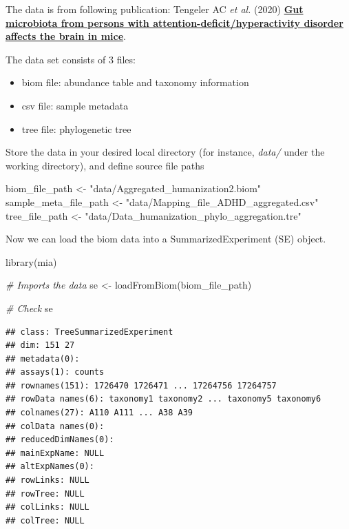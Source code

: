 \documentclass[
]{book}
\newenvironment{Shaded}{\begin{snugshade}}{\end{snugshade}}
\newcommand{\CommentTok}[1]{\textcolor[rgb]{0.56,0.35,0.01}{\textit{#1}}}
\newcommand{\FunctionTok}[1]{\textcolor[rgb]{0.00,0.00,0.00}{#1}}
\newcommand{\NormalTok}[1]{#1}
\newcommand{\OtherTok}[1]{\textcolor[rgb]{0.56,0.35,0.01}{#1}}
\newcommand{\StringTok}[1]{\textcolor[rgb]{0.31,0.60,0.02}{#1}}
\providecommand{\tightlist}{%
  \setlength{\itemsep}{0pt}\setlength{\parskip}{0pt}}
\begin{document}
The data is from following publication:
Tengeler AC \emph{et al.} (2020) \href{https://doi.org/10.1186/s40168-020-00816-x}{\textbf{Gut microbiota from persons with
attention-deficit/hyperactivity disorder affects the brain in
mice}}.

The data set consists of 3 files:

\begin{itemize}
\tightlist
\item
  biom file: abundance table and taxonomy information
\item
  csv file: sample metadata
\item
  tree file: phylogenetic tree
\end{itemize}

Store the data in your desired local directory (for instance, \emph{data/} under the
working directory), and define source file paths

\begin{Shaded}
\begin{Highlighting}[]
\NormalTok{biom\_file\_path }\OtherTok{\textless{}{-}} \StringTok{"data/Aggregated\_humanization2.biom"}
\NormalTok{sample\_meta\_file\_path }\OtherTok{\textless{}{-}} \StringTok{"data/Mapping\_file\_ADHD\_aggregated.csv"}
\NormalTok{tree\_file\_path }\OtherTok{\textless{}{-}} \StringTok{"data/Data\_humanization\_phylo\_aggregation.tre"}
\end{Highlighting}
\end{Shaded}

Now we can load the biom data into a SummarizedExperiment (SE) object.

\begin{Shaded}
\begin{Highlighting}[]
\FunctionTok{library}\NormalTok{(mia)}

\CommentTok{\# Imports the data}
\NormalTok{se }\OtherTok{\textless{}{-}} \FunctionTok{loadFromBiom}\NormalTok{(biom\_file\_path)}

\CommentTok{\# Check}
\NormalTok{se}
\end{Highlighting}
\end{Shaded}

\begin{verbatim}
## class: TreeSummarizedExperiment 
## dim: 151 27 
## metadata(0):
## assays(1): counts
## rownames(151): 1726470 1726471 ... 17264756 17264757
## rowData names(6): taxonomy1 taxonomy2 ... taxonomy5 taxonomy6
## colnames(27): A110 A111 ... A38 A39
## colData names(0):
## reducedDimNames(0):
## mainExpName: NULL
## altExpNames(0):
## rowLinks: NULL
## rowTree: NULL
## colLinks: NULL
## colTree: NULL
\end{verbatim}
\end{document}
